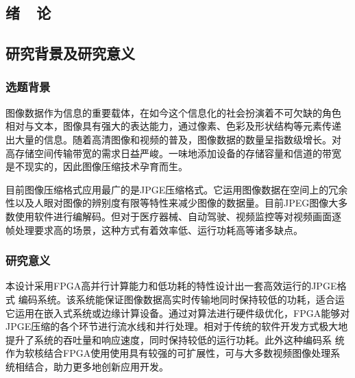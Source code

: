 \documentclass{article}
\numberwithin {equation}{section}
\begin{document}
\newpage
\tableofcontents

\newpage
\setcounter{page}{1}

\begin{spacing}{1.25} %
\section{绪\ \ 论}
  \subsection{研究背景及研究意义}
  \subsubsection{选题背景}
    \vspace{1em}
    图像数据作为信息的重要载体，在如今这个信息化的社会扮演着不可欠缺的角色
    相对与文本，图像具有强大的表达能力，通过像素、色彩及形状结构等元素传递
    出大量的信息。随着高清图像和视频的普及，图像数据的数量呈指数级增长。对
    高存储空间传输带宽的需求日益严峻。一味地添加设备的存储容量和信道的带宽
    是不现实的，因此图像压缩技术孕育而生。

    目前图像压缩格式应用最广的是JPGE压缩格式。它运用图像数据在空间上的冗余
    性以及人眼对图像的辨别度有限等特性来减少图像的数据量。目前JPEG图像大多
    数使用软件进行编解码。但对于医疗器械、自动驾驶、视频监控等对视频画面逐
    帧处理要求高的场景，这种方式有着效率低、运行功耗高等诸多缺点。
  \subsubsection{研究意义}
    \vspace{1em}
    本设计采用FPGA高并行计算能力和低功耗的特性设计出一套高效运行的JPGE格式
    编码系统。该系统能保证图像数据高实时传输地同时保持较低的功耗，适合运
    它运用在嵌入式系统或边缘计算设备。通过对算法进行硬件级优化，FPGA能够对
    JPGE压缩的各个环节进行流水线和并行处理。相对于传统的软件开发方式极大地
    提升了系统的吞吐量和响应速度，同时保持较低的运行功耗。此外这种编码系
    统作为软核结合FPGA使用使用具有较强的可扩展性，可与大多数视频图像处理系
    统相结合，助力更多地创新应用开发。

\end{spacing}
\end{document}
